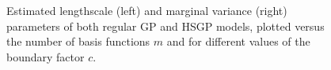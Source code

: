 \documentclass[onecolumn,a4paper,11pt]{article}
\begin{document}
\begin{figure}
\caption{Estimated lengthscale (left) and marginal variance (right) parameters of both regular GP and HSGP models, plotted versus the number of basis functions $m$ and for different values of the boundary factor $c$.}
  \label{fig5_lscale_vs_J}
\end{figure}
\end{document}
